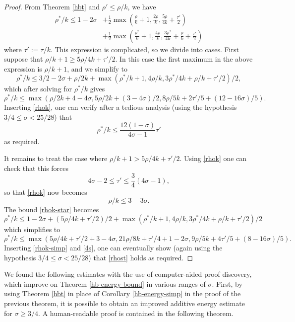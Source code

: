 \begin{proof}
From Theorem \ref{hbt} and $\rho' \le \rho/k$, we have
\begin{equation}\label{rhok-star}
\begin{split}
\rho^*/k \leq 1-2\sigma &+ \frac{1}{2}\max\left(\frac{\rho}{k}+1, \frac{2\rho}{k}, \frac{5\rho}{4k} + \frac{\tau'}{2}\right)\\
&+ \frac{1}{2}\max\left(\frac{\rho^*}{k}+1, \frac{4\rho}{k}, \frac{3\rho^*}{4k}+\frac{\rho}{k}+\frac{\tau'}{2}\right)
\end{split}
\end{equation}
where $\tau' := \tau/k$.  This expression is complicated, so we divide into cases.
First suppose that $\rho/k+1 \geq 5\rho/4k + \tau'/2$.  In this case the first maximum in the above expression is $\rho/k+1$, and we simplify to
$$ \rho^*/k \leq 3/2-2\sigma + \rho/2k + \max(\rho^*/k+1, 4\rho/k, 3\rho^*/4k+\rho/k+\tau'/2)/2,$$
which after solving for $\rho^*/k$ gives
$$ \rho^*/k \leq \max( \rho/2k + 4-4\sigma, 5\rho/2k + (3-4\sigma)/2, 8\rho/5k + 2\tau'/5 + (12-16\sigma)/5).$$
Inserting \eqref{rhok}, one can verify after a tedious analysis (using the hypothesis $3/4 \leq \sigma < 25/28$) that
\begin{equation}\label{rhost}
    \rho^*/k \leq \frac{12(1-\sigma)}{4\sigma-1} \tau'
\end{equation}
as required.

It remains to treat the case where $\rho/k+1 > 5\rho/4k + \tau'/2$.  Using \eqref{rhok} one can check that this forces
\begin{equation}\label{4s}
    4\sigma-2 \leq \tau' \leq \frac{3}{4}(4\sigma-1),
\end{equation}
so that \eqref{rhok} now becomes
\begin{equation}\label{rhok-simp}
\rho/k \leq 3-3\sigma.
\end{equation}
The bound \eqref{rhok-star} becomes
$$\rho^*/k \leq 1-2\sigma + (5\rho/4k+\tau'/2)/2 + \max(\rho^*/k+1, 4\rho/k, 3\rho^*/4k+\rho/k+\tau'/2)/2$$
which simplifies to
$$ \rho^*/k \leq \max( 5\rho/4k + \tau'/2 + 3-4\sigma, 21\rho/8k + \tau'/4 + 1-2\sigma, 9\rho/5k + 4\tau'/5 + (8 - 16\sigma)/5).$$
Inserting \eqref{rhok-simp} and \eqref{4s}, one can eventually show (again using the hypothesis $3/4 \leq \sigma < 25/28$) that
\eqref{rhost} holds as required.
\end{proof}

We found the following estimates with the use of computer-aided proof discovery, which improve on Theorem \ref{hb-energy-bound} in various ranges of $\sigma$. First, by using Theorem \ref{hbt} in place of Corollary \ref{hb-energy-simp} in the proof of the previous theorem, it is possible to obtain an improved additive energy estimate for $\sigma \ge 3/4$. A human-readable proof is contained in the following theorem.

